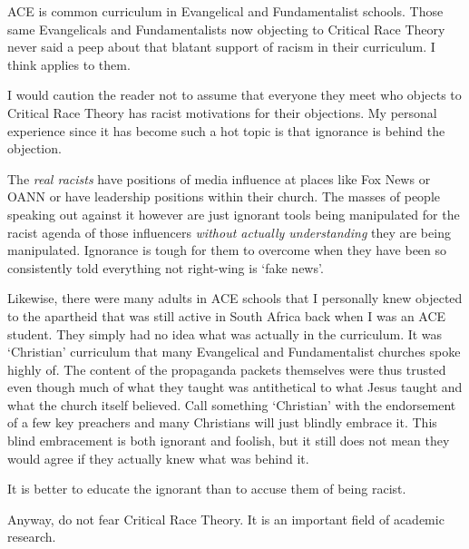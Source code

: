 ACE is common curriculum in Evangelical and Fundamentalist schools. Those same Evangelicals and Fundamentalists now objecting to Critical Race Theory never said a peep about that blatant support of racism in their curriculum. I think  applies to them.

\bigskip

I would caution the reader not to assume that everyone they meet who objects to Critical Race Theory has racist motivations for their objections. My personal experience since it has become such a hot topic is that ignorance is behind the objection.

The \emph{real racists} have positions of media influence at places like Fox News or OANN or have leadership positions within their church. The masses of people speaking out against it however are just ignorant tools being manipulated for the racist agenda of those influencers \emph{without actually understanding} they are being manipulated. Ignorance is tough for them to overcome when they have been so consistently told everything not right-wing is `fake news'.

Likewise, there were many adults in ACE schools that I personally knew objected to the apartheid that was still active in South Africa back when I was an ACE student. They simply had no idea what was actually in the curriculum. It was `Christian' curriculum that many Evangelical and Fundamentalist churches spoke highly of. The content of the propaganda packets themselves were thus trusted even though much of what they taught was antithetical to what Jesus taught and what the church itself believed. Call something `Christian' with the endorsement of a few key preachers and many Christians will just blindly embrace it. This blind embracement is both ignorant and foolish, but it still does not mean they would agree if they actually knew what was behind it.

It is better to educate the ignorant than to accuse them of being racist.

Anyway, do not fear Critical Race Theory. It is an important field of academic research.

